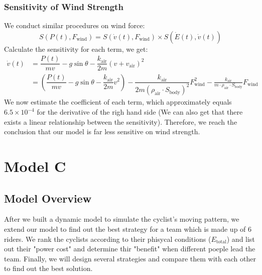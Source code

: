 \documentclass{article}
\begin{document}
			\subsubsection{Sensitivity of Wind Strength}
				We conduct similar procedures on wind force:
				\[
					S\left( P\left( t \right) ,F_{\mathrm{wind}} \right) =S\left( \dot{v}\left( t \right) ,F_{\mathrm{wind}} \right) \times S\left( \dot{E}\left( t \right) ,\dot{v}\left( t \right) \right)
				\]
				Calculate the sensitivity for each term, we get:\
				\[
					\begin{aligned}
						\dot{v}\left( t \right) &=\dfrac{P\left( t \right)}{mv}-g\sin \theta -\dfrac{k_{\mathrm{air}}}{2m}\left( v+v_{\mathrm{air}} \right) ^2
						\\
						&=\left( \dfrac{P\left( t \right)}{mv}-g\sin \theta -\dfrac{k_{\mathrm{air}}}{2m}v^2 \right) -\dfrac{k_{\mathrm{air}}}{2m\left( \rho _{\mathrm{air}}\cdot S_{\mathrm{body}} \right) ^2}F_{\mathrm{wind}}^{2}-\frac{k_{\mathrm{air}}}{m\cdot \rho _{\mathrm{air}}\cdot S_{\mathrm{body}}}F_{\mathrm{wind}}
					\end{aligned}
				\]
				We now estimate the coefficient of each term, which approximately equals \(6.5\times 10^{-4}\) for the derivative of the righ hand side (We can also get that there exists a linear relationship between the sensitivity). Therefore, we reach the conclusion that our model is far less sensitive on wind strength.

	\section{Model C}
		\subsection{Model Overview}
			After we built a dynamic model to simulate the cyclist's moving pattern, we extend our model to find out the best strategy for a team which is made up of 6 riders. We rank the cyclists according to their phisycal conditions ($E_\mathrm{total}$) and list out their "power cost" and determine thir "benefit" when different poeple lead the team. Finally, we will design several strategies and compare them with each other to find out the best solution.
\end{document}
